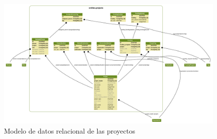 \begin{figure}[!htbp]
	\centering
	\includegraphics[angle=-90, scale=0.35]{fig/dbmodel/projects}
	\caption{Modelo de datos relacional de las proyectos}
	\label{fig:projectsmodel}
\end{figure}